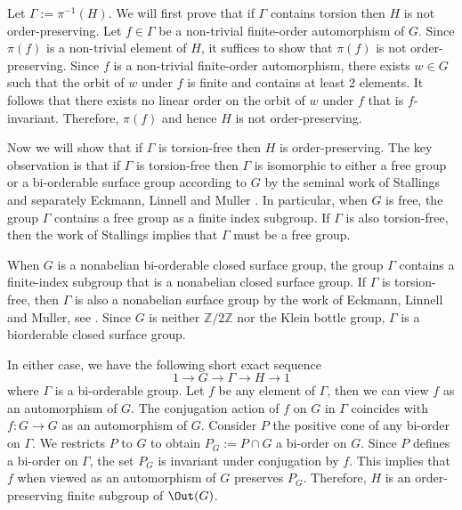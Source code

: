 \documentclass{amsart}
\makeatletter
\renewenvironment{proof}[1][\proofname]{%
   \par\pushQED{\qed}\normalfont%
   \topsep6\p@\@plus6\p@\relax
   \trivlist\item[\hskip\labelsep\bfseries#1\@addpunct{.}]%
   \ignorespaces
}{%
   \popQED\endtrivlist\@endpefalse
}
\makeatother
\begin{document}
\begin{proof}[Proof of \cref{thm:FiniteOrderOP}]
    Let $\Gamma := \pi^{-1}(H)$. We will first prove that if $\Gamma$ contains torsion then $H$ is not order-preserving. Let $f \in \Gamma$ be a non-trivial finite-order automorphism of $G$. Since $\pi(f)$ is a non-trivial element of $H$, it suffices to show that $\pi(f)$ is not order-preserving. Since $f$ is a non-trivial finite-order automorphism, there exists $w \in G$ such that the orbit of $w$ under $f$ is finite and contains at least 2 elements. It follows that there exists no linear order on the orbit of $w$ under $f$ that is $f$-invariant. Therefore, $\pi(f)$ and hence $H$ is not order-preserving. 
    
    Now we will show that if $\Gamma$ is torsion-free then $H$ is order-preserving. The key observation is that if $\Gamma$ is torsion-free then $\Gamma$ is isomorphic to either a free group or a bi-orderable surface group according to $G$ by the seminal work of Stallings \cite{Stallings68} and separately Eckmann, Linnell and Muller \cite{Eckmann84}. In particular, when $G$ is free, the group $\Gamma$ contains a free group as a finite index subgroup. If $\Gamma$ is also torsion-free, then the work of Stallings \cite{Stallings68} implies that $\Gamma$ must be a free group.
    
    When $G$ is a nonabelian bi-orderable closed surface group, the group $\Gamma$ contains a finite-index subgroup that is a nonabelian closed surface group. If $\Gamma$ is torsion-free, then $\Gamma$ is also a nonabelian surface group by the work of Eckmann, Linnell and Muller, see \cite[Corollary 1.2]{Eckmann84}. Since $G$ is neither $\mathbb{Z}/2\mathbb{Z}$ nor the Klein bottle group, $\Gamma$ is a biorderable closed surface group.
    
    In either case, we have the following short exact sequence
    \begin{equation}
    \label{eq:FiniteCyclicExtensionOfG}
        1 \to G \to \Gamma \to H \to 1
    \end{equation}
    where $\Gamma$ is a bi-orderable group. Let $f$ be any element of $\Gamma$, then we can view $f$ as an automorphism of $G$. The conjugation action of $f$ on $G$ in $\Gamma$ coincides with $f:G\to G$ as an automorphism of $G$. Consider $P$ the positive cone of any bi-order on $\Gamma$. We restricts $P$ to $G$ to obtain $P_G := P\cap G$ a bi-order on $G$. Since $P$ defines a bi-order on $\Gamma$, the set $P_G$ is invariant under conjugation by $f$. This implies that $f$ when viewed as an automorphism of $G$ preserves $P_G$. Therefore, $H$ is an order-preserving finite subgroup of $\Out(G)$. 
\end{proof}
\end{document}

